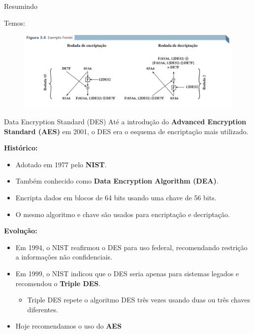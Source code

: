 \begin{frame}{Resumindo}

    Temos:
    \begin{figure}
        \centering
        \includegraphics[width=0.9\linewidth]{Figuras/feistel-resumo-livro.png}

    \end{figure}



\end{frame}

\begin{frame}{Data Encryption Standard (DES)}
    Até a introdução do \textbf{Advanced Encryption Standard (AES)} em 2001, o DES era o esquema de encriptação mais utilizado.

    \vspace{0.3cm}
    \textbf{Histórico:}
    \begin{itemize}
        \item Adotado em 1977 pelo \textbf{NIST}.
        \item Também conhecido como \textbf{Data Encryption Algorithm (DEA)}.
        \item Encripta dados em blocos de 64 bits usando uma chave de 56 bits.
        \item O mesmo algoritmo e chave são usados para encriptação e decriptação.
    \end{itemize}

    \vspace{0.3cm}
    \textbf{Evolução:}
    \begin{itemize}
        \item Em 1994, o NIST reafirmou o DES para uso federal, recomendando restrição a informações não confidenciais.
        \item Em 1999, o NIST indicou que o DES seria apenas para sistemas legados e recomendou o \textbf{Triple DES}.
              \begin{itemize}
                  \item Triple DES repete o algoritmo DES três vezes usando duas ou três chaves diferentes.
              \end{itemize}
        \item Hoje recomendamos o uso do \textbf{AES}
    \end{itemize}


\end{frame}

